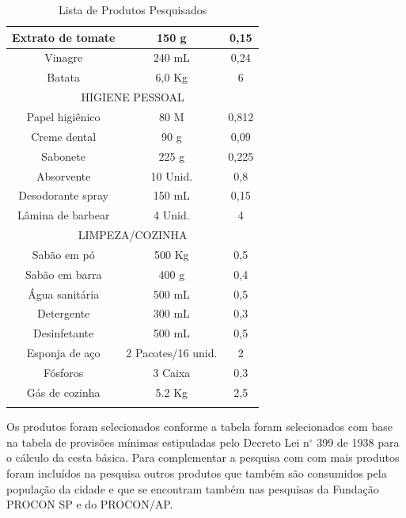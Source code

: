 \documentclass{ifto-tex}
\begin{document}
\begin{longtable}{|c|c|c|}
			\hline
			Extrato de tomate & 150 g              & 0,15            \\
			\hline
			Vinagre           & 240 mL             & 0,24            \\
			\hline
			Batata            & 6,0 Kg             & 6               \\
			\hline
			\multicolumn{3}{|c|}{HIGIENE PESSOAL}                      \\
			\hline
			Papel higiênico   & 80 M               & 0,812           \\
			\hline
			Creme dental      & 90 g               & 0,09            \\
			\hline
			Sabonete          & 225 g              & 0,225           \\
			\hline
			Absorvente        & 10 Unid.           & 0,8             \\
			\hline
			Desodorante spray & 150 mL             & 0,15            \\
			\hline
			Lâmina de barbear & 4 Unid.            & 4               \\
			\hline
			\multicolumn{3}{|c|}{LIMPEZA/COZINHA}                      \\
			\hline
			Sabão em pó       & 500 Kg             & 0,5             \\
			\hline
			Sabão em barra    & 400 g              & 0,4             \\
			\hline
			Água sanitária    & 500 mL             & 0,5             \\
			\hline
			Detergente        & 300 mL             & 0,3             \\
			\hline
			Desinfetante      & 500 mL             & 0,5             \\
			\hline
			Esponja de aço    & 2 Pacotes/16 unid. & 2               \\
			\hline
			Fósforos          & 3 Caixa            & 0,3             \\
			\hline
			Gás de cozinha    & 5.2 Kg             & 2,5       \\
			\hline     
	\caption{Lista de Produtos Pesquisados}
	\end{longtable}
	
Os produtos foram selecionados conforme a tabela  foram selecionados com base na tabela de provisões mínimas estipuladas pelo Decreto Lei n$^{\circ}$ 399 de 1938 para o cálculo da cesta básica. Para complementar a pesquisa com com mais produtos foram incluídos na pesquisa outros produtos que também são consumidos pela população da cidade e que se encontram também nas pesquisas da Fundação PROCON SP e do PROCON/AP.
\end{document}
